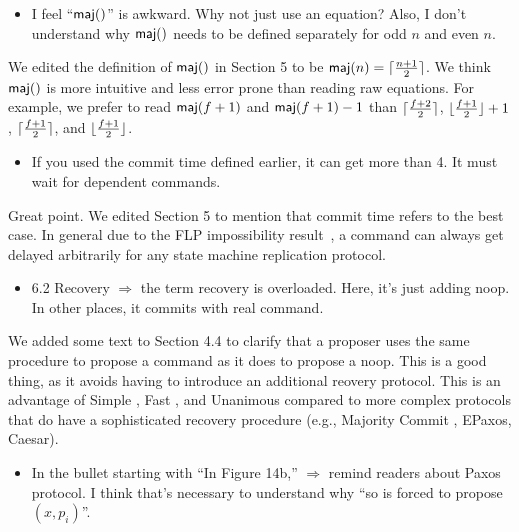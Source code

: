 \documentclass[letterpaper,twocolumn,10pt]{article}
\newenvironment{reviewerquote}
{\list{}{\leftmargin=\parindent\rightmargin=0in}\item[] \itshape \color{ReviewerDarkGray}}%
{\endlist}
\begin{document}
\begin{reviewerquote}
  \begin{itemize}
    \item
      I feel ``$\textsf{maj}()$'' is awkward. Why not just use an equation? Also, I
      don't understand why $\textsf{maj}()$ needs to be defined separately for odd $n$
      and even $n$.
  \end{itemize}
\end{reviewerquote}

We edited the definition of $\textsf{maj}()$ in Section 5 to be $\textsf{maj}(n) =
\lceil\frac{n+1}{2}\rceil$. We think $\textsf{maj}()$ is more intuitive and less error prone
than reading raw equations. For example, we prefer to read $\textsf{maj}(f+1)$ and
$\textsf{maj}(f+1) - 1$ than $\lceil\frac{f+2}{2}\rceil$, $\lfloor\frac{f+1}{2}\rfloor + 1$,
$\lceil\frac{f+1}{2}\rceil$, and $\lfloor\frac{f+1}{2}\rfloor$.

\begin{reviewerquote}
  \begin{itemize}
    \item
      If you used the commit time defined earlier, it can get more than 4. It
      must wait for dependent commands.
  \end{itemize}
\end{reviewerquote}

Great point. We edited Section 5 to mention that commit time refers to the best
case. In general due to the FLP impossibility
result~\cite{fischer1982impossibility}, a command can always get delayed
arbitrarily for any state machine replication protocol.

\begin{reviewerquote}
  \begin{itemize}
    \item
      6.2 Recovery $\Rightarrow$ the term recovery is overloaded. Here, it's
      just adding noop. In other places, it commits with real command.
  \end{itemize}
\end{reviewerquote}

We added some text to Section 4.4 to clarify that a proposer uses the same
procedure to propose a command as it does to propose a noop. This is a good
thing, as it avoids having to introduce an additional reovery protocol. This
is an advantage of Simple \BPaxos{}, Fast \BPaxos{}, and Unanimous \BPaxos{}
compared to more complex protocols that do have a sophisticated recovery
procedure (e.g., Majority Commit \BPaxos{}, EPaxos, Caesar).

\begin{reviewerquote}
  \begin{itemize}
    \item
      In the bullet starting with ``In Figure 14b,'' $\Rightarrow$ remind
      readers about Paxos protocol. I think that's necessary to understand why
      ``so is forced to propose $(x, p_i)$''.
  \end{itemize}
\end{reviewerquote}
\end{document}
